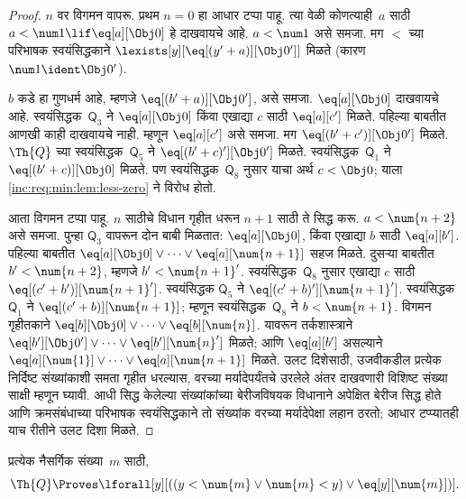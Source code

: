 \begin{proof}
$n$ वर विगमन वापरू. प्रथम $n = 0$ हा आधार टप्पा पाहू.
त्या वेळी कोणत्याही~$a$ साठी $a < \num 1 \lif \eq[a][\Obj 0]$
हे दाखवायचे आहे. $a < \num 1$ असे समजा. मग $<$ च्या
परिभाषक स्वयंसिद्धकाने $\lexists[y][\eq[(y'+a)][\Obj 0']]$
मिळते (कारण $\num 1 \ident
\Obj 0'$).

$b$ कडे हा गुणधर्म आहे, म्हणजे $\eq[(b'+a)][\Obj 0']$,
असे समजा. $\eq[a][\Obj 0]$ दाखवायचे आहे. स्वयंसिद्धक~$\mathsf{Q}_3$
ने $\eq[a][\Obj 0]$ किंवा एखाद्या $c$ साठी
$\eq[a][c']$ मिळते. पहिल्या बाबतीत आणखी काही दाखवायचे नाही.
म्हणून $\eq[a][c']$ असे समजा. मग
$\eq[(b' + c')][\Obj 0']$ मिळते. $\Th{Q}$ च्या स्वयंसिद्धक~$\mathsf{Q}_5$
ने $\eq[(b'+c)'][\Obj 0']$ मिळते. स्वयंसिद्धक~$\mathsf{Q}_1$ ने
$\eq[(b' + c)][\Obj
0]$ मिळते. पण स्वयंसिद्धक~$\mathsf{Q}_8$ नुसार याचा अर्थ
$c < \Obj 0$; याला \ref{inc:req:min:lem:less-zero} ने विरोध होतो.

आता विगमन टप्पा पाहू. $n$ साठीचे विधान गृहीत धरून $n+1$
साठी ते सिद्ध करू. $a < \num {n+2}$ असे समजा. पुन्हा
$\mathsf{Q}_3$ वापरून दोन बाबी मिळतात: $\eq[a][\Obj 0]$, किंवा
एखाद्या $b$ साठी $\eq[a][b']$. पहिल्या बाबतीत
$\eq[a][\Obj 0] \lor \dots \lor
\eq[a][\num{n+1}]$ सहज मिळते. दुसऱ्या बाबतीत $b'
< \num {n+2}$, म्हणजे $b' < \num{n+1}'$. स्वयंसिद्धक~$\mathsf{Q}_8$
नुसार एखाद्या $c$ साठी
$\eq[(c'+b')][\num{n+1}']$. स्वयंसिद्धक $\mathsf{Q}_5$ ने
$\eq[(c'+b)'][\num{n+1}']$. स्वयंसिद्धक~$\mathsf{Q}_1$ ने
$\eq[(c'+b)][\num{n+1}]$; म्हणून स्वयंसिद्धक~$\mathsf{Q}_8$ ने
$b < \num{n+1}$. विगमन गृहीतकाने
$\eq[b][\Obj 0] \lor \dots \lor \eq[b][\num{n}]$.
यावरून तर्कशास्त्राने
$\eq[b'][\Obj 0'] \lor \dots \lor \eq[b'][\num{n}']$
मिळते; आणि $\eq[a][b']$ असल्याने
$\eq[a][\num{1}] \lor \dots \lor \eq[a][\num{n+1}]$
मिळते. उलट दिशेसाठी, उजवीकडील प्रत्येक निर्दिष्ट संख्यांकाशी
समता गृहीत धरल्यास, वरच्या मर्यादेपर्यंतचे उरलेले अंतर
दाखवणारी विशिष्ट संख्या साक्षी म्हणून घ्यावी. आधी सिद्ध
केलेल्या संख्यांकांच्या बेरीजविषयक विधानाने अपेक्षित बेरीज
सिद्ध होते आणि क्रमसंबंधाच्या परिभाषक स्वयंसिद्धकाने तो संख्यांक
वरच्या मर्यादेपेक्षा लहान ठरतो;
आधार टप्प्यातही याच रीतीने उलट दिशा मिळते.
\end{proof}

\begin{lem}
  \label{inc:req:min:lem:trichotomy} प्रत्येक नैसर्गिक संख्या~$m$ साठी,
  \[  \Th{Q} \Proves
  \lforall[y][((y < \num{m} \lor \num{m} < y) \lor \eq[y][\num{m}])].
  \]
\end{lem}

